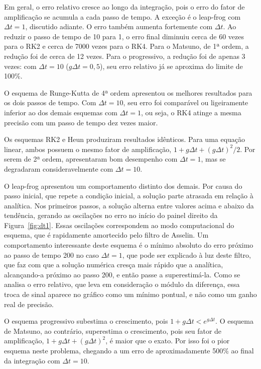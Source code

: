 \documentclass[11pt,a4paper]{article}
\begin{document}
Em geral, o erro relativo cresce ao longo da integração, pois o erro do fator de amplificação se acumula a cada passo de tempo. A exceção é o leap-frog com $\Delta t = 1$, discutido adiante. O erro também aumenta fortemente com $\Delta t$. Ao reduzir o passo de tempo de 10 para 1, o erro final diminuiu cerca de 60 vezes para o RK2 e cerca de 7000 vezes para o RK4. Para o Matsuno, de 1ª ordem, a redução foi de cerca de 12 vezes. Para o progressivo, a redução foi de apenas 3 vezes: com $\Delta t = 10$ ($g\Delta t = 0{,}5$), seu erro relativo já se aproxima do limite de 100\%.

O esquema de Runge-Kutta de 4ª ordem apresentou os melhores resultados para os dois passos de tempo. Com $\Delta t = 10$, seu erro foi comparável ou ligeiramente inferior ao dos demais esquemas com $\Delta t = 1$, ou seja, o RK4 atinge a mesma precisão com um passo de tempo dez vezes maior.

Os esquemas RK2 e Heun produziram resultados idênticos. Para uma equação linear, ambos possuem o mesmo fator de amplificação, $1 + g\Delta t + (g\Delta t)^2/2$. Por serem de 2ª ordem, apresentaram bom desempenho com $\Delta t = 1$, mas se degradaram consideravelmente com $\Delta t = 10$.

O leap-frog apresentou um comportamento distinto dos demais. Por causa do passo inicial, que repete a condição inicial, a solução parte atrasada em relação à analítica. Nos primeiros passos, a solução alterna entre valores acima e abaixo da tendência, gerando as oscilações no erro no início do painel direito da Figura~\ref{fig:dt1}. Essas oscilações correspondem ao modo computacional do esquema, que é rapidamente amortecido pelo filtro de Asselin. Um comportamento interessante deste esquema é o mínimo absoluto do erro próximo ao passo de tempo 200 no caso $\Delta t = 1$, que pode ser explicado à luz deste filtro, que faz com que a solução numérica cresça mais rápido que a analítica, alcançando-a próximo ao passo 200, e então passe a superestimá-la. Como se analisa o erro relativo, que leva em consideração o módulo da diferença, essa troca de sinal aparece no gráfico como um mínimo pontual, e não como um ganho real de precisão.

O esquema progressivo subestima o crescimento, pois $1 + g\Delta t < e^{g\Delta t}$. O esquema de Matsuno, ao contrário, superestima o crescimento, pois seu fator de amplificação, $1 + g\Delta t + (g\Delta t)^2$, é maior que o exato. Por isso foi o pior esquema neste problema, chegando a um erro de aproximadamente 500\% ao final da integração com $\Delta t = 10$. 
\end{document}
